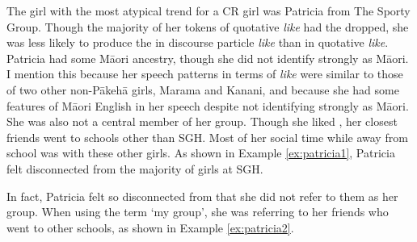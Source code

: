 The girl with the most atypical trend for a CR girl was Patricia from The Sporty Group. Though the majority of her tokens of quotative \textit{like} had the  dropped, she was less likely to produce the  in discourse particle \textit{like} than in quotative \textit{like}. Patricia had some M\=aori ancestry, though she did not identify strongly as M\=aori. I mention this because her speech patterns in terms of \textit{like} were similar to those of two other non-P\=akeh\=a girls, Marama and Kanani, and because she had some features of M\=aori English in her speech despite not identifying strongly as M\=aori. She was also not a central member of her group. Though she liked , her closest friends went to schools other than SGH. Most of her social time while away from school was with these other girls. As shown in Example \ref{ex:patricia1}, Patricia felt disconnected from the majority of girls at SGH.


\label{ex:patricia1}

\noindent In fact, Patricia felt so disconnected from  that she did not refer to them as her group. When using the term `my group', she was referring to her friends who went to other schools, as shown in Example \ref{ex:patricia2}.


